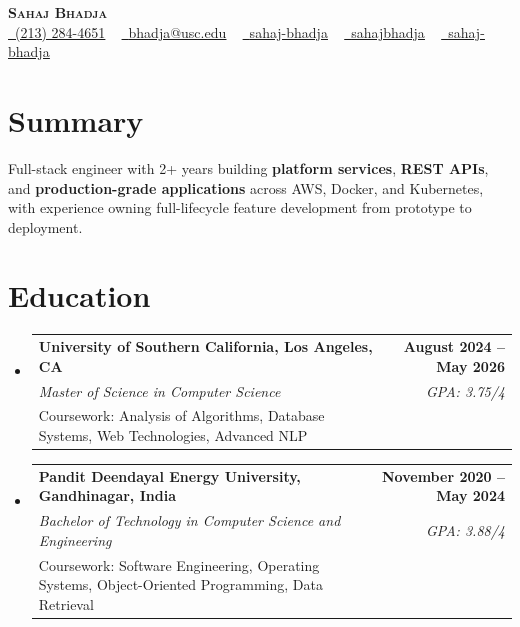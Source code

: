 \documentclass[letterpaper,10pt]{article}
\makeatletter
\newcommand{\resumeEduSubheading}[5]{\vspace{-1pt}\item\begin{tabular*}{1.0\textwidth}[t]{l@{\extracolsep{\fill}}r}\textbf{#1} & \textbf{\small #2} \\\textit{\small #3} & \textit{\small #4} \\\small #5 & \\\end{tabular*}\vspace{-4pt}}
\newcommand{\resumeSubHeadingListStart}{\begin{itemize}[leftmargin=0.0in, label={}]}
\newcommand{\resumeSubHeadingListEnd}{\end{itemize}}
\makeatother
\begin{document}
\begin{center}
{\Huge \scshape \textbf{Sahaj Bhadja}} \\ \vspace{1pt}
\small \href{tel:(213) 284-4651}{\faPhone\ \underline{(213) 284-4651}} ~ \href{mailto: bhadja@usc.edu}{\raisebox{-0.2\height}\faEnvelope\ \underline{bhadja@usc.edu}} ~
\href{https://www.linkedin.com/in/sahaj-bhadja/}{\raisebox{-0.2\height}\faLinkedin\ \underline{sahaj-bhadja}} ~ \href{https://github.com/SAHAJ-BHADJA}{\raisebox{-0.2\height}\faGithub\ \underline{sahajbhadja}} ~
\href{https://sahaj-bhadja.vercel.app/}{\raisebox{-0.2\height}\faGlobe\ \underline{sahaj-bhadja}}
\end{center}
\vspace{-18pt}
\section{Summary}
\begin{itemize}[leftmargin=0.15in, label={}]
\small{\item{Full-stack engineer with 2+ years building \textbf{platform services}, \textbf{REST APIs}, and \textbf{production-grade applications} across AWS, Docker, and Kubernetes, with experience owning full-lifecycle feature development from prototype to deployment.}}
\end{itemize}
\vspace{-16pt}
\section{Education}
\resumeSubHeadingListStart
\resumeEduSubheading{University of Southern California, Los Angeles, CA}{August 2024 -- May 2026}{Master of Science in Computer Science}{GPA: 3.75/4}{Coursework: Analysis of Algorithms, Database Systems, Web Technologies, Advanced NLP}
\vspace{-9pt}
\resumeEduSubheading{Pandit Deendayal Energy University, Gandhinagar, India}{November 2020 -- May 2024}{Bachelor of Technology in Computer Science and Engineering}{GPA: 3.88/4}{Coursework: Software Engineering, Operating Systems, Object-Oriented Programming, Data Retrieval}
\resumeSubHeadingListEnd
\vspace{-14pt}
\end{document}
